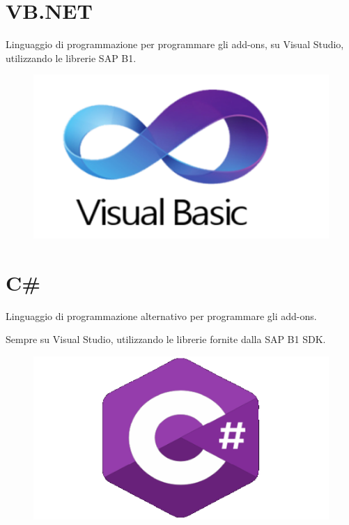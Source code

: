 \section{VB.NET}
Linguaggio di programmazione per programmare gli add-ons, su Visual Studio, utilizzando le librerie SAP B1.
\begin{figure}[!h] 
	\centering
	\includegraphics[scale = 0.4]{immagini/tecnologie/vb-header}
\end{figure}
\section{C\#}
\begin{flushleft}
	Linguaggio di programmazione alternativo per programmare gli add-ons.
	
	Sempre su Visual Studio, utilizzando le librerie fornite dalla SAP B1 SDK.
\end{flushleft}
\begin{figure}[!h] 
	\centering
	\includegraphics[scale = 0.4]{immagini/tecnologie/csharp}
\end{figure}
